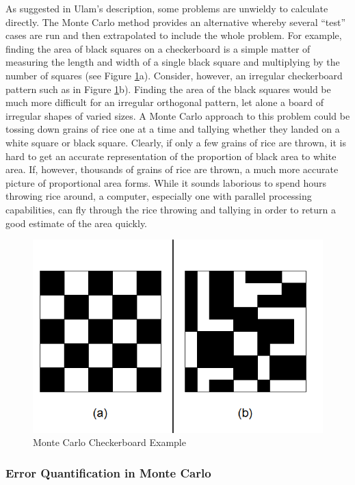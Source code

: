 As suggested in Ulam's description, some problems are unwieldy to calculate directly.  The Monte Carlo method provides an alternative whereby several ``test'' cases are run and then extrapolated to include the whole problem.  For example, finding the area of black squares on a checkerboard is a simple matter of measuring the length and width of a single black square and multiplying by the number of squares (see Figure \ref{checker}a).  Consider, however, an irregular checkerboard pattern such as in Figure \ref{checker}b).  Finding the area of the black squares would be much more difficult for an irregular orthogonal pattern, let alone a board of irregular shapes of varied sizes.  A Monte Carlo approach to this problem could be tossing down grains of rice one at a time and tallying whether they landed on a white square or black square.  Clearly, if only a few grains of rice are thrown, it is hard to get an accurate representation of the proportion of black area to white area.  If, however, thousands of grains of rice are thrown, a much more accurate picture of proportional area forms.  While it sounds laborious to spend hours throwing rice around, a computer, especially one with parallel processing capabilities, can fly through the rice throwing and tallying in order to return a good estimate of the area quickly.

\begin{figure}[htb]
\centering
\includegraphics[width=\linewidth]{./graphics/checkers}
\caption{Monte Carlo Checkerboard Example}
\label{checker}
\end{figure}

\subsubsection{Error Quantification in Monte Carlo}

